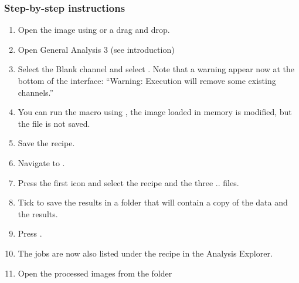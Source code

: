 \subsubsection*{Step-by-step instructions}
\begin{enumerate} 
    \item Open the image  using  or a drag and drop.
    \item Open General Analysis 3 (see introduction)
    \item Select the Blank channel and select . Note that a warning appear now at the bottom of the interface: ``Warning: Execution will remove some existing channels.''
    \item You can run the macro using , the image loaded in memory is modified, but the file is not saved.
    \item Save the recipe.
    \item Navigate to .
    \item Press the first icon  and select the recipe and the three  ..   files.
    \item Tick  to save the results in a folder 
     that will contain a copy of the data and the results.
    \item Press .
    \item The jobs are now also listed under the recipe in the Analysis Explorer.
    \item Open the processed images from the folder 
\end{enumerate}
